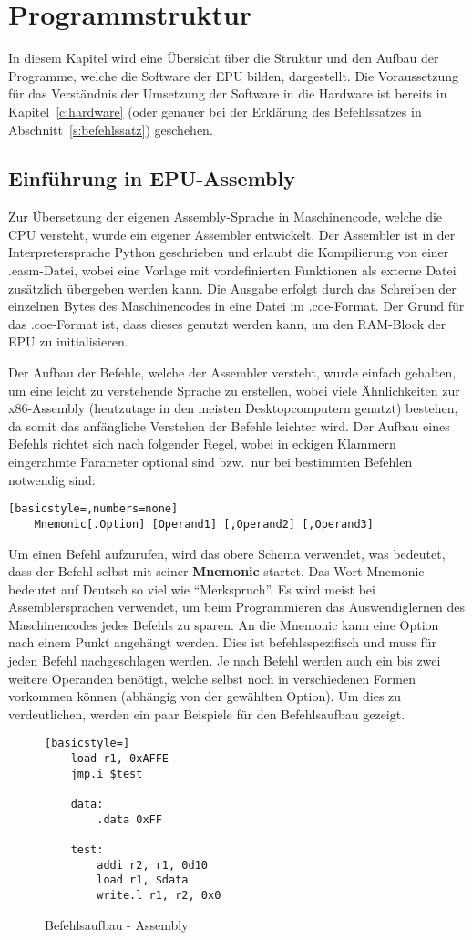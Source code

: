 \captionsetup[figure]{justification=justified,singlelinecheck=false}
\chapter{Programmstruktur}
In diesem Kapitel wird eine Übersicht über die Struktur und den Aufbau der
Programme, welche die Software der EPU bilden, dargestellt. Die
Voraussetzung für das Verständnis der Umsetzung der Software in die Hardware
ist bereits in Kapitel~\ref{c:hardware} (oder genauer bei der Erklärung des
Befehlssatzes in Abschnitt~\ref{s:befehlssatz}) geschehen.
\section{Einführung in EPU-Assembly}
Zur Übersetzung der eigenen Assembly-Sprache in Maschinencode, welche die CPU
versteht, wurde ein eigener Assembler entwickelt. Der Assembler ist in der
Interpretersprache Python geschrieben und erlaubt die Kompilierung von einer
.easm-Datei, wobei eine Vorlage mit vordefinierten Funktionen als externe Datei
zusätzlich übergeben werden kann. Die Ausgabe erfolgt durch das Schreiben der
einzelnen Bytes des Maschinencodes in eine Datei im .coe-Format. Der Grund für
das .coe-Format ist, dass dieses genutzt werden kann, um den RAM-Block der EPU
zu initialisieren.

Der Aufbau der Befehle, welche der Assembler versteht, wurde einfach
gehalten, um eine leicht zu verstehende Sprache zu erstellen, wobei viele
Ähnlichkeiten zur x86-Assembly (heutzutage in den meisten Desktopcomputern
genutzt) bestehen, da somit das anfängliche Verstehen der Befehle leichter
wird. Der Aufbau eines Befehls richtet sich nach folgender Regel, wobei in
eckigen Klammern eingerahmte Parameter optional sind bzw.\ nur bei bestimmten
Befehlen notwendig sind:
\begin{lstlisting}[basicstyle=,numbers=none]
	Mnemonic[.Option] [Operand1] [,Operand2] [,Operand3]
\end{lstlisting}

Um einen Befehl aufzurufen, wird das obere Schema verwendet, was bedeutet, dass
der Befehl selbst mit seiner \textbf{Mnemonic} startet. Das Wort Mnemonic
bedeutet auf Deutsch so viel wie "`Merkspruch"'. Es wird meist bei
Assemblersprachen verwendet, um beim Programmieren das Auswendiglernen des
Maschinencodes jedes Befehls zu sparen. An die Mnemonic kann eine Option nach
einem Punkt angehängt werden. Dies ist befehlsspezifisch und muss für jeden
Befehl nachgeschlagen werden. Je nach Befehl werden auch ein bis zwei weitere
Operanden benötigt, welche selbst noch in verschiedenen Formen vorkommen können
(abhängig von der gewählten Option). Um dies zu verdeutlichen, werden ein
paar Beispiele für den Befehlsaufbau gezeigt.
\clearpage
\begin{figure}
	\begin{lstlisting}[basicstyle=]
	load r1, 0xAFFE
	jmp.i $test

	data:
		.data 0xFF

	test:
		addi r2, r1, 0d10
		load r1, $data
		write.l r1, r2, 0x0
\end{lstlisting}
\caption{Befehlsaufbau - Assembly}
\label{code:instruction_code}
\end{figure}

